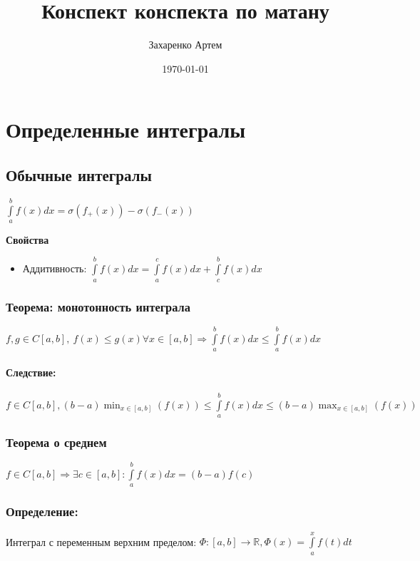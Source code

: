 \documentclass[12pt]{report} %
\author{Захаренко Артем}
\title{Конспект конспекта по матану}
\date{\today}
\begin{document}
\maketitle
\tableofcontents
\newpage

\chapter*{Определенные интегралы}

\section*{Обычные интегралы}
$\displaystyle\int\limits_{a}^{b}{f(x)dx} = \sigma(f_{+}(x)) - \sigma(f_{-}(x))$

\noindent \textbf{Свойства}
\begin{itemize}
\item Аддитивность: $\displaystyle\int\limits_{a}^{b}{f(x)dx} = \displaystyle\int\limits_{a}^{c}{f(x)dx} + \displaystyle\int\limits_{c}^{b}{f(x)dx}$
\end{itemize}

\subsection*{\textbf{Теорема: монотонность интеграла}}
$f, g \in C[a, b], \ f(x) \leqslant g(x) \forall x \in [a, b] \Rightarrow \displaystyle\int\limits_{a}^{b}{f(x)dx}
\leqslant \displaystyle\int\limits_{a}^{b}{f(x)dx}$
\subsubsection{\textbf{Следствие:}}
$f \in C[a, b], (b - a)\min_{x \in [a, b]}(f(x)) \leqslant \displaystyle\int\limits_{a}^{b}{f(x)dx} \leqslant (b - a)\max_{x \in [a, b]}(f(x))$

\subsection*{\textbf{Теорема о среднем}}
$f \in C[a, b] \Rightarrow \exists c \in [a, b]: \displaystyle\int\limits_{a}^{b}{f(x)dx} = (b - a)f(c)$

\subsection*{\textbf{Определение:}}
Интеграл с переменным верхним пределом: $\Phi: [a, b] \rightarrow \mathbb{R}, \Phi(x) = \displaystyle\int\limits_{a}^{x}{f(t)dt}$
\end{document}
